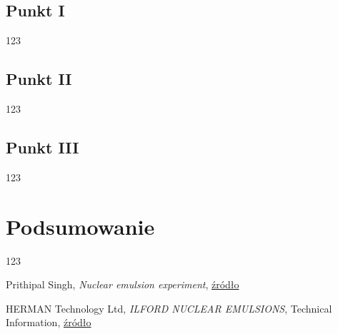 \section{Punkt I}
123
\section{Punkt II}
123
\section{Punkt III}
123
\newpage 
\chapter{Podsumowanie}
123
\newpage 

\begin{thebibliography}{99}
	Prithipal Singh,
	\emph{Nuclear emulsion experiment},
	\href{http://www.jamia-physics.net/lecnotes/lab/emulsion.pdf}{źródło}

	HERMAN Technology Ltd,
	\emph{ILFORD NUCLEAR EMULSIONS},
	Technical Information,
	\href{http://www.ilfordphoto.com/Webfiles/2011413135719219.pdf}{źródło}

\end{thebibliography}
